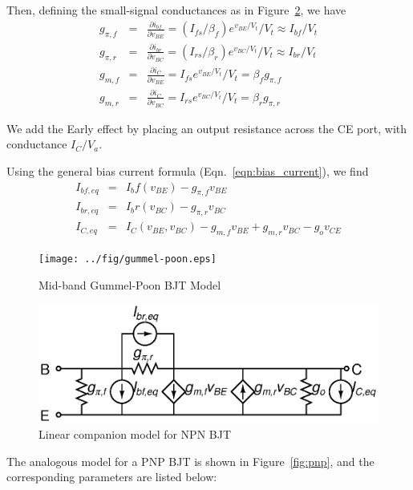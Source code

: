 \documentclass{article}
\begin{document}
Then, defining the small-signal conductances as in Figure~\ref{fig:npn}, we have
\begin{eqnarray}
g_{\pi,f}&=&\frac{\partial i_{bf}}{\partial v_{BE}}=(I_{fs}/\beta_f)e^{v_{BE}/V_t}/V_t \approx I_{bf}/V_t \\
g_{\pi,r}&=&\frac{\partial i_{br}}{\partial v_{BC}}=(I_{rs}/\beta_r)e^{v_{BC}/V_t}/V_t \approx I_{br}/V_t \\
g_{m,f}&=&\frac{\partial i_C}{\partial v_{BE}}=I_{fs}e^{v_{BE}/V_t}/V_t=\beta_fg_{\pi,f} \\
g_{m,r}&=&\frac{\partial i_C}{\partial v_{BC}}=I_{rs}e^{v_{BC}/V_t}/V_t=\beta_rg_{\pi,r}
\end{eqnarray}

We add the Early effect by placing an output resistance across the CE port, with conductance $I_C/V_a$.

Using the general bias current formula (Eqn.~\ref{eqn:bias_current}), we find
\begin{eqnarray}
I_{bf,eq}&=&I_bf(v_{BE})-g_{\pi,f}v_{BE} \\
I_{br,eq}&=&I_br(v_{BC})-g_{\pi,r}v_{BC} \\
I_{C,eq}&=&I_C(v_{BE},v_{BC})-g_{m,f}v_{BE}+g_{m,r}v_{BC}-g_ov_{CE}
\end{eqnarray}

\begin{figure}[h]
\begin{center}
\texttt{[image: ../fig/gummel-poon.eps]}
\caption{Mid-band Gummel-Poon BJT Model \label{fig:gummel-poon}}
\end{center}
\end{figure}

\begin{figure}[h]
\begin{center}
\includegraphics{../fig/npn.eps}
\caption{Linear companion model for NPN BJT \label{fig:npn}}
\end{center}
\end{figure}

The analogous model for a PNP BJT is shown in Figure~\ref{fig:pnp}, and the corresponding parameters are listed below:
\end{document}
